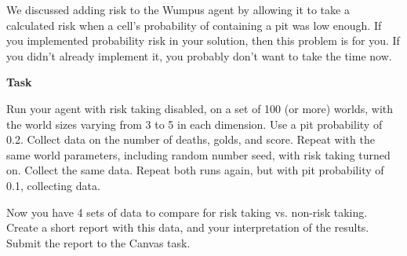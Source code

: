\begin{problem}{25}

  We discussed adding risk to the Wumpus agent by
  allowing it to take a calculated risk when a cell's
  probability of containing a pit was low enough.
  If you implemented probability risk in your solution,
  then this problem is for you.  If you didn't already
  implement it, you probably don't want to take the time
  now.
  
  \vspace{.1in}
  \textbf{Task}
  
  Run your agent with risk taking disabled, on a set of
  100 (or more) worlds, with the world sizes varying from
  3 to 5 in each dimension.  Use a pit probability of 0.2.
  Collect data on the number of deaths, golds, and score.
  Repeat with the same world parameters, including random number seed,
  with risk taking turned on.  Collect the same data.
  Repeat both runs again, but with pit probability of 0.1, collecting data.

  Now you have 4 sets of data to compare for risk taking vs. non-risk taking.
  Create a short report with this data, and your interpretation of the
  results.  Submit the report to the Canvas task.

\end{problem}


